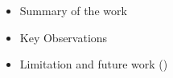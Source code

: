 
\begin{itemize}
    \item Summary of the work
    \item Key Observations
    \item Limitation and future work ()
\end{itemize}